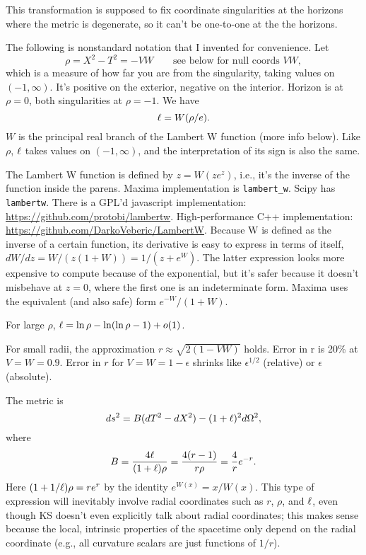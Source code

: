 \documentclass{article}
\begin{document}
This transformation is supposed to fix coordinate singularities at the horizons where the
metric is degenerate, so it can't be one-to-one at the the horizons.

The following is nonstandard notation that I invented for convenience.
Let
\begin{equation}
  \rho = X^2-T^2 = -VW \qquad \text{see below for null coords $VW$},
\end{equation}
which is a measure of how far you are from the singularity, taking values on $(-1,\infty)$.
It's positive on the exterior, negative on the interior. Horizon is at
$\rho=0$, both singularities at $\rho=-1$. We have
\begin{equation}
  \ell  = W(\rho/e).
\end{equation}
$W$ is the principal real branch of the Lambert W function (more info below).
Like $\rho$, $\ell $ takes values on $(-1,\infty)$, and
the interpretation of its sign is also the same. 

The Lambert 
W function is defined
by $z=W(ze^z)$, i.e., it's the inverse of the function inside the parens. 
Maxima implementation is \texttt{lambert\_w}. Scipy has \texttt{lambertw}.
There is a GPL'd javascript implementation: \url{https://github.com/protobi/lambertw}.
High-performance C++ implementation: \url{https://github.com/DarkoVeberic/LambertW}.
Because W is defined as the inverse of a certain function, its derivative is easy
to express in terms of itself, $dW/dz=W/(z(1+W))=1/(z+e^W)$. The latter expression
looks more expensive to compute because of the exponential, but it's safer because
it doesn't misbehave at $z=0$, where the first one is an indeterminate form.
Maxima uses the equivalent (and also safe) form $e^{-W}/(1+W)$.

For large $\rho$,
$\ell =\ln\rho-\ln(\ln\rho-1)+o(1)$.

For small radii,
the approximation $r\approx\sqrt{2(1-VW)}$ holds. 
Error in r is 20\% at $V=W=0.9$. Error in $r$ for $V=W=1-\epsilon$
shrinks like $\epsilon^{1/2}$ (relative) or $\epsilon$ (absolute).

The metric is
\begin{equation}
  ds^2 = B(dT^2-dX^2)-(1+\ell )^2d\Omega^2,
\end{equation}
where
\begin{equation}
  B = \frac{4\ell }{(1+\ell )\rho} = \frac{4(r-1)}{r\rho}  = \frac{4}{r}e^{-r}.
\end{equation}
Here $(1+1/\ell )\rho=re^r$ by the identity $e^{W(x)}=x/W(x)$. 
This type of expression will inevitably involve radial coordinates such as $r$, $\rho$, and
$\ell $, even though KS doesn't even explicitly talk about radial coordinates; this makes
sense because the local, intrinsic properties of the spacetime only depend on the radial
coordinate (e.g., all curvature scalars are just functions of $1/r$).
\end{document}
